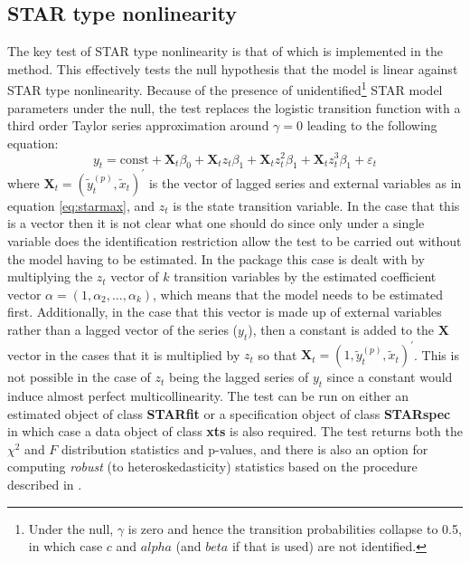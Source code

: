 \subsection{STAR type nonlinearity}
The key test of STAR type nonlinearity is that of \cite{Luukkonen1988} which
is implemented in the  method. This effectively tests the
null hypothesis that the model is linear against STAR type nonlinearity. 
Because of the presence of unidentified\footnote{Under the null, $\gamma$ is 
zero and hence the transition probabilities collapse to 0.5, in which case $c$
and $alpha$ (and $beta$ if that is used) are not identified.} STAR model 
parameters under the null, the test replaces the logistic transition function 
with a third order Taylor series approximation around $\gamma=0$ leading to the
following equation:
\begin{equation}
{y_t} = \text{const}+{{\mathbf{X}}_t}{\beta _0} + {{\mathbf{X}}_t}{z_t}{\beta
_1} + {{\mathbf{X}}_t}z_t^2{\beta _1} + {{\mathbf{X}}_t}z_t^3{\beta _1} + {\varepsilon _t}
\end{equation}
where ${{\mathbf{X}}_t} = {\left( {\tilde y_t^{\left( p \right)},{{\tilde
x}_t}} \right)^\prime }$ is the vector of lagged series and external variables
as in equation \ref{eq:starmax}, and $z_t$ is the state transition variable. In
the case that this is a vector then it is not clear what one should do since
only under a single variable does the identification restriction allow the test
to be carried out without the model having to be estimated. In the package this
case is dealt with by multiplying the $z_t$ vector of $k$ transition variables
by the estimated coefficient vector $\alpha=(1,\alpha_2,\ldots,\alpha_k)$, which
means that the model needs to be estimated first. Additionally, in the case that
this vector is made up of external variables rather than a lagged vector of the
series ($y_t$), then a constant is added to the $\mathbf{X}$ vector in the cases
that it is multiplied by $z_t$ so that ${{\mathbf{X}}_t} = {\left(1, {\tilde
y_t^{\left( p \right)},{{\tilde x}_t}} \right)^\prime }$. This is not possible
in the case of $z_t$ being the lagged series of $y_t$ since a constant would
induce almost perfect multicollinearity.
The test can be run on either an estimated object of class \textbf{STARfit} or a
specification object of class \textbf{STARspec} in which case a data object of
class \textbf{xts} is also required. The test returns both the $\chi^2$ and $F$
distribution statistics and p-values, and there is also an option for computing
\emph{robust} (to heteroskedasticity) statistics based on the procedure
described in \cite{Granger1993}.

